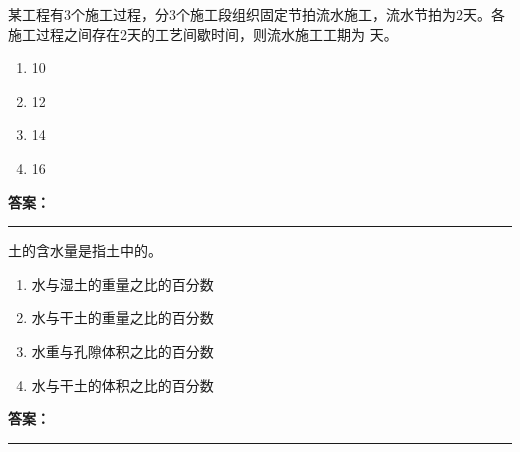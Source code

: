 \documentclass[UTF8,fontset=fandol,11pt]{ctexart}
\newcommand{\answerline}{\textcolor{answerred}{\rule{2.4cm}{0.7pt}}}
\begin{document}
\begin{quizbox}[title={乱序第 127 题｜第十章流水施工原理}]

某工程有3个施工过程，分3个施工段组织固定节拍流水施工，流水节拍为2天。各施工过程之间存在2天的工艺间歇时间，则流水施工工期为 天。\\

\begin{enumerate}[label=\Alph*.]

\item 10

\item 12

\item 14

\item 16

\end{enumerate}

\textbf{\textcolor{answerred}{答案：}} \answerline

\end{quizbox}

\vspace{0.2em}

\begin{quizbox}[title={乱序第 128 题｜第一章土方工程}]

土的含水量是指土中的。\\

\begin{enumerate}[label=\Alph*.]

\item 水与湿土的重量之比的百分数

\item 水与干土的重量之比的百分数

\item 水重与孔隙体积之比的百分数

\item 水与干土的体积之比的百分数

\end{enumerate}

\textbf{\textcolor{answerred}{答案：}} \answerline

\end{quizbox}

\vspace{0.2em}
\end{document}

